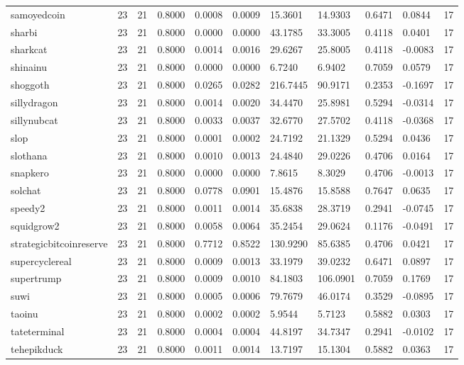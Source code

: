 \begin{table}[htbp]
\begin{tabular}{lllllllllll}
samoyedcoin & 23 & 21 & 0.8000 & 0.0008 & 0.0009 & 15.3601 & 14.9303 & 0.6471 & 0.0844 & 17 \\
sharbi & 23 & 21 & 0.8000 & 0.0000 & 0.0000 & 43.1785 & 33.3005 & 0.4118 & 0.0401 & 17 \\
sharkcat & 23 & 21 & 0.8000 & 0.0014 & 0.0016 & 29.6267 & 25.8005 & 0.4118 & -0.0083 & 17 \\
shinainu & 23 & 21 & 0.8000 & 0.0000 & 0.0000 & 6.7240 & 6.9402 & 0.7059 & 0.0579 & 17 \\
shoggoth & 23 & 21 & 0.8000 & 0.0265 & 0.0282 & 216.7445 & 90.9171 & 0.2353 & -0.1697 & 17 \\
sillydragon & 23 & 21 & 0.8000 & 0.0014 & 0.0020 & 34.4470 & 25.8981 & 0.5294 & -0.0314 & 17 \\
sillynubcat & 23 & 21 & 0.8000 & 0.0033 & 0.0037 & 32.6770 & 27.5702 & 0.4118 & -0.0368 & 17 \\
slop & 23 & 21 & 0.8000 & 0.0001 & 0.0002 & 24.7192 & 21.1329 & 0.5294 & 0.0436 & 17 \\
slothana & 23 & 21 & 0.8000 & 0.0010 & 0.0013 & 24.4840 & 29.0226 & 0.4706 & 0.0164 & 17 \\
snapkero & 23 & 21 & 0.8000 & 0.0000 & 0.0000 & 7.8615 & 8.3029 & 0.4706 & -0.0013 & 17 \\
solchat & 23 & 21 & 0.8000 & 0.0778 & 0.0901 & 15.4876 & 15.8588 & 0.7647 & 0.0635 & 17 \\
speedy2 & 23 & 21 & 0.8000 & 0.0011 & 0.0014 & 35.6838 & 28.3719 & 0.2941 & -0.0745 & 17 \\
squidgrow2 & 23 & 21 & 0.8000 & 0.0058 & 0.0064 & 35.2454 & 29.0624 & 0.1176 & -0.0491 & 17 \\
strategicbitcoinreserve & 23 & 21 & 0.8000 & 0.7712 & 0.8522 & 130.9290 & 85.6385 & 0.4706 & 0.0421 & 17 \\
supercyclereal & 23 & 21 & 0.8000 & 0.0009 & 0.0013 & 33.1979 & 39.0232 & 0.6471 & 0.0897 & 17 \\
supertrump & 23 & 21 & 0.8000 & 0.0009 & 0.0010 & 84.1803 & 106.0901 & 0.7059 & 0.1769 & 17 \\
suwi & 23 & 21 & 0.8000 & 0.0005 & 0.0006 & 79.7679 & 46.0174 & 0.3529 & -0.0895 & 17 \\
taoinu & 23 & 21 & 0.8000 & 0.0002 & 0.0002 & 5.9544 & 5.7123 & 0.5882 & 0.0303 & 17 \\
tateterminal & 23 & 21 & 0.8000 & 0.0004 & 0.0004 & 44.8197 & 34.7347 & 0.2941 & -0.0102 & 17 \\
tehepikduck & 23 & 21 & 0.8000 & 0.0011 & 0.0014 & 13.7197 & 15.1304 & 0.5882 & 0.0363 & 17 \\

\end{tabular}
\end{table}
